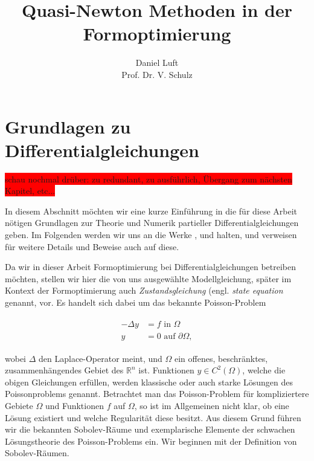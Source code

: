 \documentclass[bibliography=totoc,12pt,a4paper]{scrartcl}
\theoremstyle{exampstyle}
\numberwithin{equation}{section}
\begin{document}
\title{Quasi-Newton Methoden in der Formoptimierung}

\author{Daniel Luft \\ Prof. Dr. V. Schulz}

  \pagestyle{empty}

  \pagestyle{headings}
  

\section{Grundlagen zu Differentialgleichungen}


\colorbox{red}{schau nochmal drüber: zu redundant, zu ausführlich, Übergang zum nächsten Kapitel, etc...}

In diesem Abschnitt möchten wir eine kurze Einführung in die für diese Arbeit nötigen Grundlagen zur Theorie und Numerik partieller Differentialgleichungen geben. Im Folgenden werden wir uns an die Werke \cite{PDE1}, \cite{PDE2} und \cite{PDE3} halten, und verweisen für weitere Details und Beweise auch auf diese.

Da wir in dieser Arbeit Formoptimierung bei Differentialgleichungen betreiben möchten, stellen wir hier die von uns ausgewählte Modellgleichung, später im Kontext der Formoptimierung auch \textit{Zustandsgleichung} (engl. \textit{state equation} genannt, vor. Es handelt sich dabei um das bekannte Poisson-Problem

\begin{align}\label{Poissonproblem}
	\begin{aligned}
	-\Delta y &=  f  \text{ in } \Omega \; \\ y &= 0 \text{ auf } \partial \Omega,
	\end{aligned}
\end{align}

wobei $\Delta$ den Laplace-Operator meint, und $\Omega$ ein offenes, beschränktes, zusammenhängendes Gebiet des $\mathbb{R}^n$ ist. Funktionen $y\in C^2(\Omega)$, welche die obigen Gleichungen erfüllen, werden klassische oder auch starke Lösungen des Poissonproblems genannt. Betrachtet man das Poisson-Problem für kompliziertere Gebiete $\Omega$ und Funktionen $f$ auf $\Omega$, so ist im Allgemeinen nicht klar, ob eine Lösung existiert und welche Regularität diese besitzt. Aus diesem Grund führen wir die bekannten Sobolev-Räume und exemplarische Elemente der schwachen Lösungstheorie des Poisson-Problems ein. Wir beginnen mit der Definition von Sobolev-Räumen.
\end{document}
